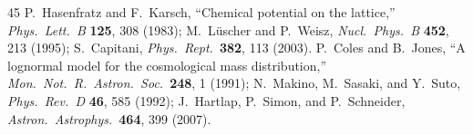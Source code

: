 \documentclass[11pt,a4paper]{article}
\begin{document}
\begin{thebibliography}{45}
 P.~Hasenfratz and F.~Karsch, ``Chemical potential on the lattice,'' \textit{Phys.\ Lett.\ B} \textbf{125}, 308 (1983); M.~L\"uscher and P.~Weisz, \textit{Nucl.\ Phys.\ B} \textbf{452}, 213 (1995); S.~Capitani, \textit{Phys.\ Rept.}\ \textbf{382}, 113 (2003).
 P.~Coles and B.~Jones, ``A lognormal model for the cosmological mass distribution,'' \textit{Mon.\ Not.\ R.\ Astron.\ Soc.}\ \textbf{248}, 1 (1991); N.~Makino, M.~Sasaki, and Y.~Suto, \textit{Phys.\ Rev.\ D} \textbf{46}, 585 (1992); J.~Hartlap, P.~Simon, and P.~Schneider, \textit{Astron.\ Astrophys.}\ \textbf{464}, 399 (2007).
\end{thebibliography}
\end{document}
